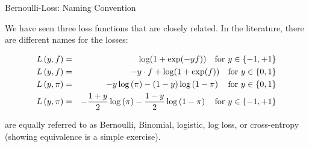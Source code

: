 \documentclass[11pt,compress,t,notes=noshow, xcolor=table]{beamer}
\begin{document}
\begin{vbframe}{Bernoulli-Loss: Naming Convention}

We have seen three loss functions that are closely related. In the literature, there are different names for the losses: 


\begin{eqnarray*} L\left(y, f\right) &=& \log(1+\exp(-yf)) \quad \text{for } y \in \{-1, +1\} \\
L\left(y, f\right) &=& - y \cdot f + \log(1 + \exp(f)) \quad \text{for } y \in \{0, 1\} \\
L\left(y, \pi\right) &=& - y \log \left(\pi\right) - (1 - y) \log \left(1 - \pi\right) \quad \text{for } y \in \{0, 1\} \\
L\left(y, \pi\right) &=& - \frac{1 + y}{2} \log\left(\pi\right) - \frac{1 - y}{2} \log\left(1 - \pi\right) \quad \text{for } y \in \{-1, +1\} \end{eqnarray*}

\lz

are equally referred to as Bernoulli, Binomial, logistic, log loss, or cross-entropy (showing equivalence is a simple exercise).





\end{vbframe}
\end{document}
